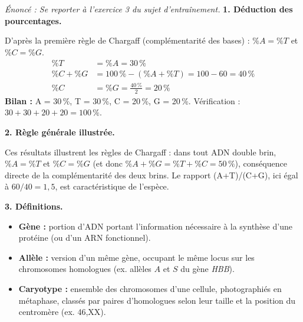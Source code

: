 \documentclass[11pt]{article}
\newcommand{\cle}[1]{{\popxbold\color{popdark}#1}}
\begin{document}
\begin{corrige}
\textit{Énoncé : Se reporter à l'exercice 3 du sujet d'entraînement.}
\tcblower
\textbf{1. Déduction des pourcentages.}

D'après la première règle de Chargaff (complémentarité des bases) : $\%A = \%T$ et $\%C = \%G$.
\begin{align*}
\%T &= \%A = 30\,\% \\
\%C + \%G &= 100\,\% - (\%A + \%T) = 100 - 60 = 40\,\% \\
\%C &= \%G = \frac{40\,\%}{2} = 20\,\%
\end{align*}
\textbf{Bilan :} A = 30\,\%, T = 30\,\%, C = 20\,\%, G = 20\,\%. Vérification : $30+30+20+20 = 100\,\%$. 

\textbf{2. Règle générale illustrée.}

Ces résultats illustrent les \cle{règles de Chargaff} : dans tout ADN double brin, $\%A = \%T$ et $\%C = \%G$ (et donc $\%A + \%G = \%T + \%C = 50\,\%$), conséquence directe de la complémentarité des deux brins. Le rapport (A+T)/(C+G), ici égal à $60/40 = 1,5$, est caractéristique de l'espèce.

\textbf{3. Définitions.}
\begin{itemize}
    \item \textbf{Gène :} portion d'ADN portant l'information nécessaire à la synthèse d'une protéine (ou d'un ARN fonctionnel).
    \item \textbf{Allèle :} version d'un même gène, occupant le même locus sur les chromosomes homologues (ex. allèles $A$ et $S$ du gène \emph{HBB}).
    \item \textbf{Caryotype :} ensemble des chromosomes d'une cellule, photographiés en métaphase, classés par paires d'homologues selon leur taille et la position du centromère (ex. 46,XX).
\end{itemize}
\end{corrige}
\end{document}
